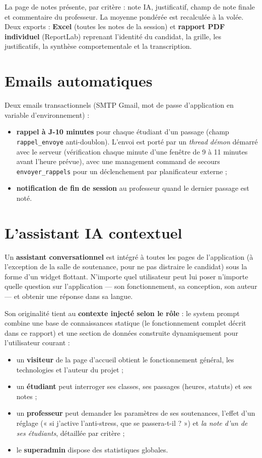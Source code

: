 \documentclass[12pt,a4paper]{report}
\begin{document}
La page de notes présente, par critère : note IA, justificatif, champ de note
finale et commentaire du professeur. La moyenne pondérée est recalculée à la
volée. Deux exports : \textbf{Excel} (toutes les notes de la session) et
\textbf{rapport PDF individuel} (ReportLab) reprenant l'identité du candidat,
la grille, les justificatifs, la synthèse comportementale et la transcription.

\section{Emails automatiques}

Deux emails transactionnels (SMTP Gmail, mot de passe d'application en
variable d'environnement) :
\begin{itemize}
  \item \textbf{rappel à J-10 minutes} pour chaque étudiant d'un passage
        (champ \texttt{rappel\_envoye} anti-doublon). L'envoi est porté par un
        \emph{thread démon} démarré avec le serveur (vérification chaque
        minute d'une fenêtre de 9 à 11 minutes avant l'heure prévue), avec une
        management command de secours \texttt{envoyer\_rappels} pour un
        déclenchement par planificateur externe ;
  \item \textbf{notification de fin de session} au professeur quand le dernier
        passage est noté.
\end{itemize}

\section{L'assistant IA contextuel}

Un \textbf{assistant conversationnel} est intégré à toutes les pages de
l'application (à l'exception de la salle de soutenance, pour ne pas distraire
le candidat) sous la forme d'un widget flottant. N'importe quel utilisateur
peut lui poser n'importe quelle question sur l'application --- son
fonctionnement, sa conception, son auteur --- et obtenir une réponse dans sa
langue.

Son originalité tient au \textbf{contexte injecté selon le rôle} : le system
prompt combine une base de connaissances statique (le fonctionnement complet
décrit dans ce rapport) et une section de données construite dynamiquement
pour l'utilisateur courant :

\begin{itemize}
  \item un \textbf{visiteur} de la page d'accueil obtient le fonctionnement
        général, les technologies et l'auteur du projet ;
  \item un \textbf{étudiant} peut interroger ses classes, ses passages
        (heures, statuts) et ses notes ;
  \item un \textbf{professeur} peut demander les paramètres de ses
        soutenances, l'effet d'un réglage (« si j'active l'anti-stress, que se
        passera-t-il ? ») et \emph{la note d'un de ses étudiants}, détaillée
        par critère ;
  \item le \textbf{superadmin} dispose des statistiques globales.
\end{itemize}
\end{document}
